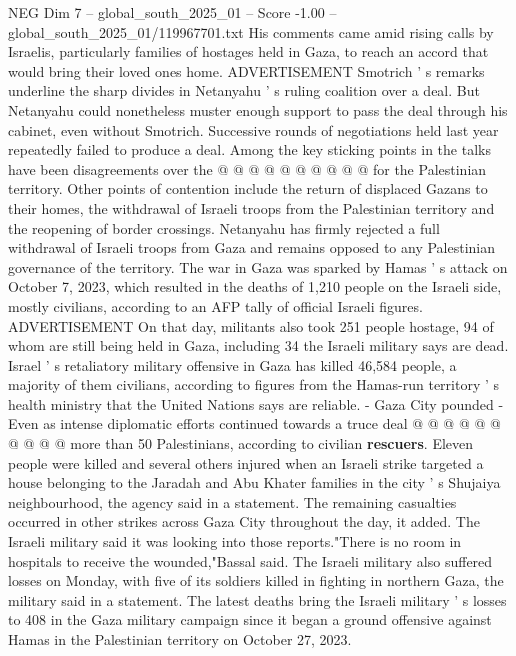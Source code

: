 \begin{textsample}{NEG Dim 7 – global\_south\_2025\_01 – Score -1.00 – global\_south\_2025\_01/119967701.txt}
His comments came amid rising calls by Israelis, particularly families of hostages held in Gaza, to reach an accord that would bring their loved ones home.
ADVERTISEMENT Smotrich ' s remarks underline the sharp divides in Netanyahu ' s ruling coalition over a deal.
But Netanyahu could nonetheless muster enough support to pass the deal through his cabinet, even without Smotrich.
Successive rounds of negotiations held last year repeatedly failed to produce a deal.
Among the key sticking points in the talks have been disagreements over the @ @ @ @ @ @ @ @ @ @ for the Palestinian territory.
Other points of contention include the return of displaced Gazans to their homes, the withdrawal of Israeli troops from the Palestinian territory and the reopening of border crossings.
Netanyahu has firmly rejected a full withdrawal of Israeli troops from Gaza and remains opposed to any Palestinian governance of the territory.
The war in Gaza was sparked by Hamas ' s attack on October 7, 2023, which resulted in the deaths of 1,210 people on the Israeli side, mostly civilians, according to an AFP tally of official Israeli figures.
ADVERTISEMENT On that day, militants also took 251 people hostage, 94 of whom are still being held in Gaza, including 34 the Israeli military says are dead.
Israel ' s retaliatory military offensive in Gaza has killed 46,584 people, a majority of them civilians, according to figures from the Hamas-run territory ' s health ministry that the United Nations says are reliable. - Gaza City pounded - Even as intense diplomatic efforts continued towards a truce deal @ @ @ @ @ @ @ @ @ @ more than 50 Palestinians, according to civilian \textbf{rescuers}.
Eleven people were killed and several others injured when an Israeli strike targeted a house belonging to the Jaradah and Abu Khater families in the city ' s Shujaiya neighbourhood, the agency said in a statement.
The remaining casualties occurred in other strikes across Gaza City throughout the day, it added.
The Israeli military said it was looking into those reports."There is no room in hospitals to receive the wounded,"Bassal said.
The Israeli military also suffered losses on Monday, with five of its soldiers killed in fighting in northern Gaza, the military said in a statement.
The latest deaths bring the Israeli military ' s losses to 408 in the Gaza military campaign since it began a ground offensive against Hamas in the Palestinian territory on October 27, 2023.

\end{textsample}
